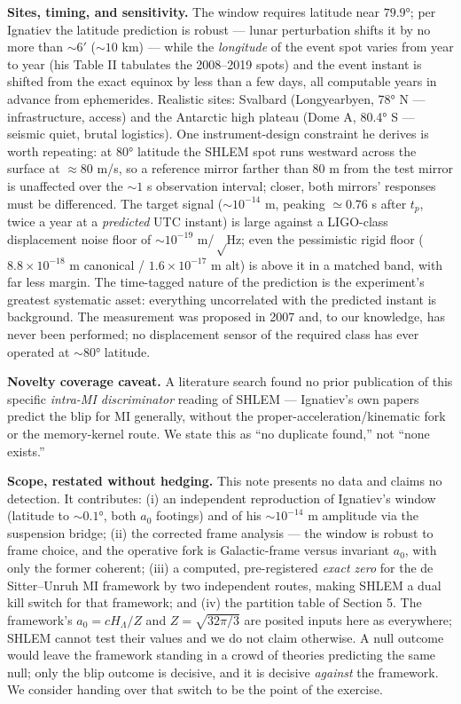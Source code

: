 \documentclass[
]{article}
\newcounter{none} %
\begin{document}
\textbf{Sites, timing, and sensitivity.} The window requires latitude
near \(79.9°\); per Ignatiev the latitude prediction is robust --- lunar
perturbation shifts it by no more than \(\sim6'\) (\(\sim10\) km) ---
while the \emph{longitude} of the event spot varies from year to year
(his Table II tabulates the 2008--2019 spots) and the event instant is
shifted from the exact equinox by less than a few days, all computable
years in advance from ephemerides. Realistic sites: Svalbard
(Longyearbyen, 78° N --- infrastructure, access) and the Antarctic high
plateau (Dome A, 80.4° S --- seismic quiet, brutal logistics). One
instrument-design constraint he derives is worth repeating: at \(80°\)
latitude the SHLEM spot runs westward across the surface at
\(\approx 80\) m/s, so a reference mirror farther than \(80\) m from the
test mirror is unaffected over the \(\sim1\) s observation interval;
closer, both mirrors' responses must be differenced. The target signal
(\(\sim10^{-14}\) m, peaking \(\simeq0.76\) s after \(t_p\), twice a
year at a \emph{predicted} UTC instant) is large against a LIGO-class
displacement noise floor of \(\sim10^{-19}\) m/\(\sqrt\mathrm{Hz}\); even
the pessimistic rigid floor (\(8.8\times10^{-18}\) m canonical /
\(1.6\times10^{-17}\) m alt) is above it in a matched band, with far
less margin. The time-tagged nature of the prediction is the
experiment's greatest systematic asset: everything uncorrelated with the
predicted instant is background. The measurement was proposed in 2007
and, to our knowledge, has never been performed; no displacement sensor
of the required class has ever operated at \(\sim80°\) latitude.

\textbf{Novelty coverage caveat.} A literature search found no prior
publication of this specific \emph{intra-MI discriminator} reading of
SHLEM --- Ignatiev's own papers predict the blip for MI generally,
without the proper-acceleration/kinematic fork or the memory-kernel
route. We state this as ``no duplicate found,'' not ``none exists.''

\textbf{Scope, restated without hedging.} This note presents no data and
claims no detection. It contributes: (i) an independent reproduction of
Ignatiev's window (latitude to \(\sim0.1°\), both \(a_0\) footings) and
of his \(\sim10^{-14}\) m amplitude via the suspension bridge; (ii) the
corrected frame analysis --- the window is robust to frame choice, and
the operative fork is Galactic-frame versus invariant \(a_0\), with only
the former coherent; (iii) a computed, pre-registered \emph{exact zero}
for the de Sitter--Unruh MI framework by two independent routes, making
SHLEM a dual kill switch for that framework; and (iv) the partition
table of Section 5. The framework's \(a_0 = cH_\Lambda/Z\) and
\(Z = \sqrt{32\pi/3}\) are posited inputs here as everywhere; SHLEM
cannot test their values and we do not claim otherwise. A null outcome
would leave the framework standing in a crowd of theories predicting the
same null; only the blip outcome is decisive, and it is decisive
\emph{against} the framework. We consider handing over that switch to be
the point of the exercise.
\end{document}
